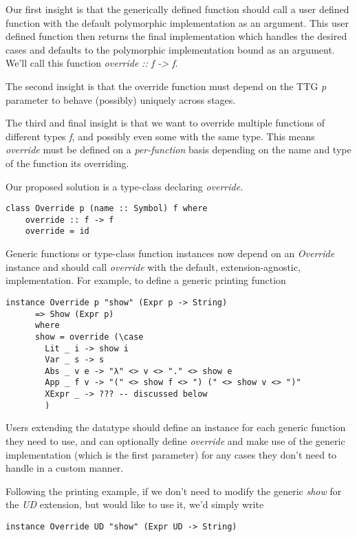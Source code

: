 \documentclass{article}
\begin{document}
Our first insight is that the generically defined function should call a user
defined function with the default polymorphic implementation as an argument.
This user defined function then returns the final implementation which handles
the desired cases and defaults to the polymorphic implementation bound as an
argument. We'll call this function \emph{override :: f -> f}.

The second insight is that the override function must depend on the TTG \emph{p}
parameter to behave (possibly) uniquely across stages.

The third and final insight is that we want to override multiple
functions of different types \emph{f}, and possibly even some with the same
type. This means \emph{override} must be defined on a \emph{per-function} basis
depending on the name and type of the function its overriding.

Our proposed solution is a type-class declaring \emph{override}.

\begin{lstlisting}
class Override p (name :: Symbol) f where
    override :: f -> f
    override = id
\end{lstlisting}

Generic functions or type-class function instances now depend on an \emph{Override}
instance and should call \emph{override} with the default, extension-agnostic,
implementation. For example, to define a generic printing function

\begin{lstlisting}
instance Override p "show" (Expr p -> String)
      => Show (Expr p)
      where
      show = override (\case
        Lit _ i -> show i
        Var _ s -> s
        Abs _ v e -> "λ" <> v <> "." <> show e
        App _ f v -> "(" <> show f <> ") (" <> show v <> ")"
        XExpr _ -> ??? -- discussed below
        )
\end{lstlisting}

Users extending the datatype should define an instance for
each generic function they need to use, and can optionally define
\emph{override} and make use of the generic implementation (which is the first
parameter) for any cases they don't need to handle in a custom manner.

Following the printing example, if we don't need to modify the generic
\emph{show} for the \emph{UD} extension, but would like to use it, we'd simply
write
\begin{lstlisting}
instance Override UD "show" (Expr UD -> String)
\end{lstlisting}
\end{document}
